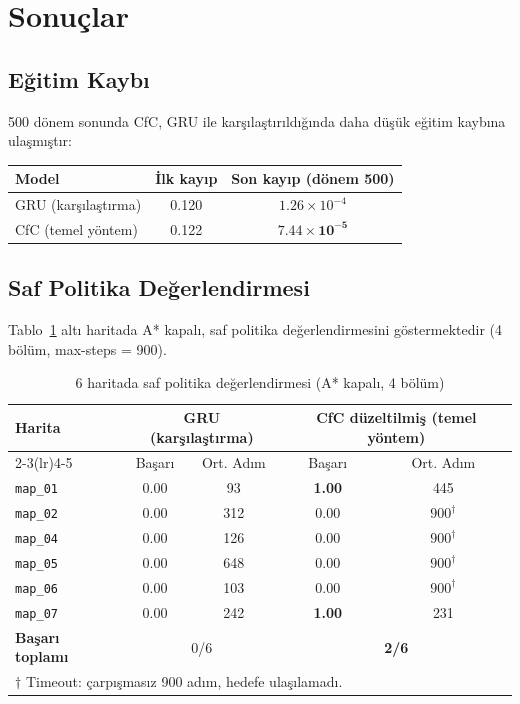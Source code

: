 \documentclass[11pt,a4paper]{article}
\newcommand{\code}[1]{\texttt{#1}}
\begin{document}
\section{Sonuçlar}

\subsection{Eğitim Kaybı}

500 dönem sonunda CfC, GRU ile karşılaştırıldığında daha düşük eğitim
kaybına ulaşmıştır:

\begin{center}
\begin{tabular}{lcc}
\toprule
\textbf{Model} & \textbf{İlk kayıp} & \textbf{Son kayıp (dönem 500)} \\
\midrule
GRU (karşılaştırma)  & 0.120 & $1.26\times10^{-4}$ \\
CfC (temel yöntem)   & 0.122 & $\mathbf{7.44\times10^{-5}}$ \\
\bottomrule
\end{tabular}
\end{center}

\subsection{Saf Politika Değerlendirmesi}

Tablo~\ref{tab:final} altı haritada A* kapalı, saf politika
değerlendirmesini göstermektedir (4 bölüm, max-steps = 900).

\begin{table}[h]
\centering
\caption{6 haritada saf politika değerlendirmesi (A* kapalı, 4 bölüm)}
\label{tab:final}
\begin{tabular}{lcccc}
\toprule
\textbf{Harita}
  & \multicolumn{2}{c}{\textbf{GRU (karşılaştırma)}}
  & \multicolumn{2}{c}{\textbf{CfC düzeltilmiş (temel yöntem)}} \\
\cmidrule(lr){2-3}\cmidrule(lr){4-5}
  & Başarı & Ort. Adım & Başarı & Ort. Adım \\
\midrule
\code{map\_01} & 0.00 &  93 & \textbf{1.00} & 445 \\
\code{map\_02} & 0.00 & 312 & 0.00 & $900^\dagger$ \\
\code{map\_04} & 0.00 & 126 & 0.00 & $900^\dagger$ \\
\code{map\_05} & 0.00 & 648 & 0.00 & $900^\dagger$ \\
\code{map\_06} & 0.00 & 103 & 0.00 & $900^\dagger$ \\
\code{map\_07} & 0.00 & 242 & \textbf{1.00} & 231 \\
\midrule
\textbf{Başarı toplamı} & \multicolumn{2}{c}{0/6}
                         & \multicolumn{2}{c}{\textbf{2/6}} \\
\bottomrule
\multicolumn{5}{l}{$\dagger$ Timeout: çarpışmasız 900 adım, hedefe ulaşılamadı.}
\end{tabular}
\end{table}
\end{document}
